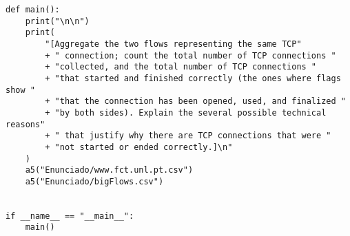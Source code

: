 \begin{lstlisting}
def main():
    print("\n\n")
    print(
        "[Aggregate the two flows representing the same TCP"
        + " connection; count the total number of TCP connections "
        + "collected, and the total number of TCP connections "
        + "that started and finished correctly (the ones where flags show "
        + "that the connection has been opened, used, and finalized "
        + "by both sides). Explain the several possible technical reasons"
        + " that justify why there are TCP connections that were "
        + "not started or ended correctly.]\n"
    )
    a5("Enunciado/www.fct.unl.pt.csv")
    a5("Enunciado/bigFlows.csv")


if __name__ == "__main__":
    main()

\end{lstlisting}

